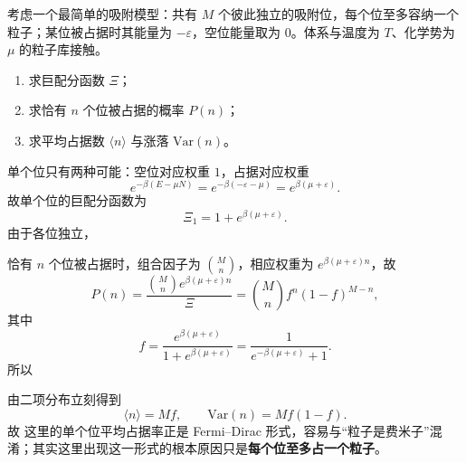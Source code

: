 \begin{question}[16分]
考虑一个最简单的吸附模型：共有 $M$ 个彼此独立的吸附位，每个位至多容纳一个粒子；某位被占据时其能量为 $-\varepsilon$，空位能量取为 $0$。体系与温度为 $T$、化学势为 $\mu$ 的粒子库接触。
\begin{enumerate}[label=（\arabic*）,leftmargin=2.8em,itemsep=0.2em]
\item 求巨配分函数 $\Xi$；
\item 求恰有 $n$ 个位被占据的概率 $P(n)$；
\item 求平均占据数 $\langle n\rangle$ 与涨落 $\mathrm{Var}(n)$。
\end{enumerate}
\begin{solution}

单个位只有两种可能：空位对应权重 $1$，占据对应权重
\[
e^{-\beta(E-\mu N)}=e^{-\beta(-\varepsilon-\mu)}=e^{\beta(\mu+\varepsilon)}.
\]
故单个位的巨配分函数为
\[
\Xi_1=1+e^{\beta(\mu+\varepsilon)}.
\]
由于各位独立，

恰有 $n$ 个位被占据时，组合因子为 $\binom{M}{n}$，相应权重为 $e^{\beta(\mu+\varepsilon)n}$，故
\[
P(n)=\frac{\binom{M}{n}e^{\beta(\mu+\varepsilon)n}}{\Xi}
=\binom{M}{n}f^n(1-f)^{M-n},
\]
其中
\[
f=\frac{e^{\beta(\mu+\varepsilon)}}{1+e^{\beta(\mu+\varepsilon)}}
=\frac{1}{e^{-\beta(\mu+\varepsilon)}+1}.
\]
所以

由二项分布立刻得到
\[
\langle n\rangle=Mf,\qquad
\mathrm{Var}(n)=Mf(1-f).
\]
故
这里的单个位平均占据率正是 Fermi--Dirac 形式，容易与“粒子是费米子”混淆；其实这里出现这一形式的根本原因只是\textbf{每个位至多占一个粒子}。
\end{solution}
\end{question}

